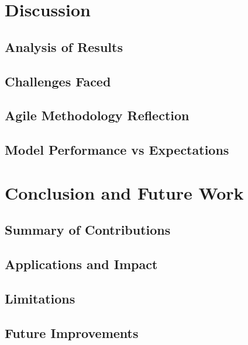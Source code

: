 \documentclass{report}
\begin{document}
\chapter{Discussion}  %
\section{Analysis of Results}
\section{Challenges Faced}
\section{Agile Methodology Reflection}
\section{Model Performance vs Expectations}

\chapter{Conclusion and Future Work}  %
\section{Summary of Contributions}
\section{Applications and Impact}
\section{Limitations}
\section{Future Improvements}


\printbibliography%

\appendix
\end{document}
